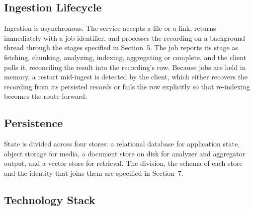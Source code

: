 \subsection{Ingestion Lifecycle}

Ingestion is asynchronous. The service accepts a file or a link, returns immediately
with a job identifier, and processes the recording on a background thread through the
stages specified in Section~5. The job reports its stage as fetching, chunking,
analyzing, indexing, aggregating or complete, and the client polls it, reconciling the
result into the recording's row. Because jobs are held in memory, a restart mid-ingest
is detected by the client, which either recovers the recording from its persisted
records or fails the row explicitly so that re-indexing becomes the route forward.

\subsection{Persistence}

State is divided across four stores: a relational database for application state, object
storage for media, a document store on disk for analyzer and aggregator output, and a
vector store for retrieval. The division, the schema of each store and the identity that
joins them are specified in Section~7.

\subsection{Technology Stack}

